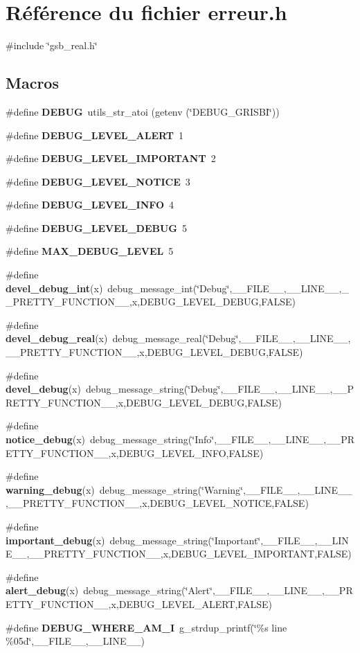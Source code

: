 \section{Référence du fichier erreur.h}
\label{erreur_8h}
{\ttfamily \#include \char`\"{}gsb\_\-real.h\char`\"{}}\par
\subsection*{Macros}
\begin{DoxyCompactItemize}
\item 
\#define {\bf DEBUG}~utils\_\-str\_\-atoi (getenv (\char`\"{}DEBUG\_\-GRISBI\char`\"{}))
\item 
\#define {\bf DEBUG\_\-LEVEL\_\-ALERT}~1
\item 
\#define {\bf DEBUG\_\-LEVEL\_\-IMPORTANT}~2
\item 
\#define {\bf DEBUG\_\-LEVEL\_\-NOTICE}~3
\item 
\#define {\bf DEBUG\_\-LEVEL\_\-INFO}~4
\item 
\#define {\bf DEBUG\_\-LEVEL\_\-DEBUG}~5
\item 
\#define {\bf MAX\_\-DEBUG\_\-LEVEL}~5
\item 
\#define {\bf devel\_\-debug\_\-int}(x)~debug\_\-message\_\-int(\char`\"{}Debug\char`\"{},\_\-\_\-FILE\_\-\_\-,\_\-\_\-LINE\_\-\_\-,\_\-\_\-PRETTY\_\-FUNCTION\_\-\_\-,x,DEBUG\_\-LEVEL\_\-DEBUG,FALSE)
\item 
\#define {\bf devel\_\-debug\_\-real}(x)~debug\_\-message\_\-real(\char`\"{}Debug\char`\"{},\_\-\_\-FILE\_\-\_\-,\_\-\_\-LINE\_\-\_\-,\_\-\_\-PRETTY\_\-FUNCTION\_\-\_\-,x,DEBUG\_\-LEVEL\_\-DEBUG,FALSE)
\item 
\#define {\bf devel\_\-debug}(x)~debug\_\-message\_\-string(\char`\"{}Debug\char`\"{},\_\-\_\-FILE\_\-\_\-,\_\-\_\-LINE\_\-\_\-,\_\-\_\-PRETTY\_\-FUNCTION\_\-\_\-,x,DEBUG\_\-LEVEL\_\-DEBUG,FALSE)
\item 
\#define {\bf notice\_\-debug}(x)~debug\_\-message\_\-string(\char`\"{}Info\char`\"{},\_\-\_\-FILE\_\-\_\-,\_\-\_\-LINE\_\-\_\-,\_\-\_\-PRETTY\_\-FUNCTION\_\-\_\-,x,DEBUG\_\-LEVEL\_\-INFO,FALSE)
\item 
\#define {\bf warning\_\-debug}(x)~debug\_\-message\_\-string(\char`\"{}Warning\char`\"{},\_\-\_\-FILE\_\-\_\-,\_\-\_\-LINE\_\-\_\-,\_\-\_\-PRETTY\_\-FUNCTION\_\-\_\-,x,DEBUG\_\-LEVEL\_\-NOTICE,FALSE)
\item 
\#define {\bf important\_\-debug}(x)~debug\_\-message\_\-string(\char`\"{}Important\char`\"{},\_\-\_\-FILE\_\-\_\-,\_\-\_\-LINE\_\-\_\-,\_\-\_\-PRETTY\_\-FUNCTION\_\-\_\-,x,DEBUG\_\-LEVEL\_\-IMPORTANT,FALSE)
\item 
\#define {\bf alert\_\-debug}(x)~debug\_\-message\_\-string(\char`\"{}Alert\char`\"{},\_\-\_\-FILE\_\-\_\-,\_\-\_\-LINE\_\-\_\-,\_\-\_\-PRETTY\_\-FUNCTION\_\-\_\-,x,DEBUG\_\-LEVEL\_\-ALERT,FALSE)
\item 
\#define {\bf DEBUG\_\-WHERE\_\-AM\_\-I}~g\_\-strdup\_\-printf(\char`\"{}\%s line \%05d\char`\"{},\_\-\_\-FILE\_\-\_\-,\_\-\_\-LINE\_\-\_\-)
\end{DoxyCompactItemize}
